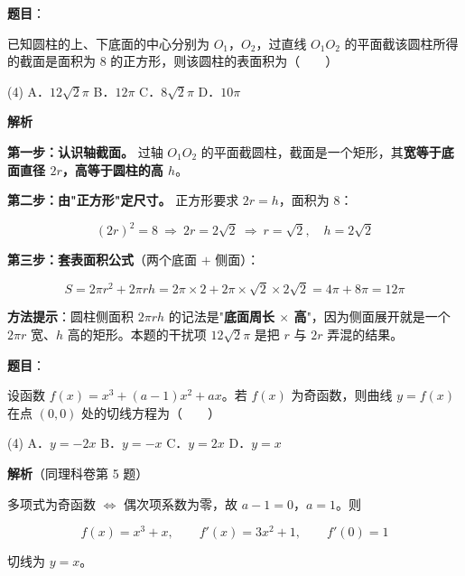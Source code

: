 \begin{answer}

\textbf{题目}：

已知圆柱的上、下底面的中心分别为 $O_1$，$O_2$，过直线 $O_1O_2$ 的平面截该圆柱所得的截面是面积为 $8$ 的正方形，则该圆柱的表面积为\mbox{（　　）}

\begin{gkopts}(4)
\task A．$12\sqrt2\pi$
\task B．$12\pi$
\task C．$8\sqrt2\pi$
\task D．$10\pi$
\end{gkopts}

\textbf{解析}

\textbf{第一步：认识轴截面。} 过轴 $O_1O_2$ 的平面截圆柱，截面是一个矩形，其\textbf{宽等于底面直径 $2r$，高等于圆柱的高 $h$}。

\textbf{第二步：由"正方形"定尺寸。} 正方形要求 $2r=h$，面积为 $8$：

\nopagebreak[4]
\[(2r)^{2}=8\ \Longrightarrow\ 2r=2\sqrt2\ \Longrightarrow\ r=\sqrt2,\quad h=2\sqrt2\]

\textbf{第三步：套表面积公式}（两个底面 $+$ 侧面）：

\nopagebreak[4]
\[S=2\pi r^{2}+2\pi rh=2\pi\times2+2\pi\times\sqrt2\times2\sqrt2=4\pi+8\pi=12\pi\]

\begin{gktip}
\textbf{方法提示}：圆柱侧面积 $2\pi rh$ 的记法是"\textbf{底面周长 $\times$ 高}"，因为侧面展开就是一个 $2\pi r$ 宽、$h$ 高的矩形。本题的干扰项 $12\sqrt2\pi$ 是把 $r$ 与 $2r$ 弄混的结果。
\end{gktip}


\par\medskip

\end{answer}
\begin{answer}

\textbf{题目}：

设函数 $f(x)=x^{3}+(a-1)x^{2}+ax$。若 $f(x)$ 为奇函数，则曲线 $y=f(x)$ 在点 $(0,0)$ 处的切线方程为\mbox{（　　）}

\begin{gkopts}(4)
\task A．$y=-2x$
\task B．$y=-x$
\task C．$y=2x$
\task D．$y=x$
\end{gkopts}

\textbf{解析}（同理科卷第 5 题）

多项式为奇函数 $\iff$ 偶次项系数为零，故 $a-1=0$，$a=1$。则

\nopagebreak[4]
\[f(x)=x^{3}+x,\qquad f'(x)=3x^{2}+1,\qquad f'(0)=1\]

切线为 $y=x$。

\par\medskip

\Needspace{0.4\textheight}


\end{answer}
